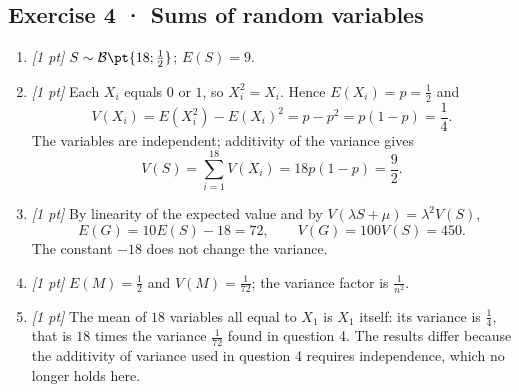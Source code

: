\subsection*{Exercise 4 · Sums of random variables}\begin{enumerate}

\item \textit{[1 pt]} $S\sim\mathcal B\pt{18;\frac{1}{2}}$; $E(S)=9$.

\item \textit{[1 pt]} Each $X_i$ equals $0$ or $1$, so $X_i^2=X_i$. Hence $E(X_i)=p=\frac{1}{2}$ and
\[V(X_i)=E(X_i^2)-E(X_i)^2=p-p^2=p(1-p)=\frac{1}{4}.\]
The variables are independent; additivity of the variance gives
\[V(S)=\sum_{i=1}^{18}V(X_i)=18p(1-p)=\frac{9}{2}.\]

\item \textit{[1 pt]} By linearity of the expected value and by $V(\lambda S+\mu)=\lambda^2V(S)$,
\[E(G)=10E(S)-18=72,\qquad V(G)=100V(S)=450.\]
The constant $-18$ does not change the variance.

\item \textit{[1 pt]} $E(M)=\frac{1}{2}$ and $V(M)=\frac{1}{72}$; the variance factor is $\frac{1}{n^2}$.

\item \textit{[1 pt]} The mean of $18$ variables all equal to $X_1$ is $X_1$ itself: its variance is $\frac{1}{4}$, that is $18$ times the variance $\frac{1}{72}$ found in question 4. The results differ because the additivity of variance used in question 4 requires independence, which no longer holds here.

\end{enumerate}

\fi

\fi

